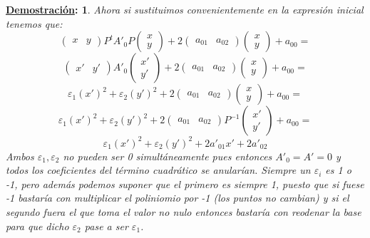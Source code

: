 \documentclass[10pt,a4paper,openright]{book}
\theoremstyle{break}
\newtheorem*{demo}{\underline{Demostración}:}
\begin{document}
\begin{demo}
Ahora si sustituimos convenientemente en la expresión inicial tenemos que:
$$\begin{pmatrix}
x & y
\end{pmatrix}P^t  A'_0 P \begin{pmatrix}
x \\ y
\end{pmatrix} + 2 \begin{pmatrix}
a_{01} & a_{02} \end{pmatrix} \begin{pmatrix}
x \\ y
\end{pmatrix} + a_{00} = $$
$$\begin{pmatrix}
x' & y'
\end{pmatrix} A'_0 \begin{pmatrix}
x' \\ y'
\end{pmatrix} + 2 \begin{pmatrix}
a_{01} & a_{02} \end{pmatrix} \begin{pmatrix}
x \\ y
\end{pmatrix} + a_{00} =$$
$$\varepsilon_1 (x')^2 + \varepsilon_2 (y')^2 + 2 \begin{pmatrix}
a_{01} & a_{02} \end{pmatrix} \begin{pmatrix}
x \\ y
\end{pmatrix} + a_{00} =$$
$$ \varepsilon_1 (x')^2 + \varepsilon_2 (y')^2 + 2 \begin{pmatrix}
a_{01} & a_{02} \end{pmatrix} P^{-1} \begin{pmatrix}
x' \\ y'
\end{pmatrix} + a_{00} = $$
$$\varepsilon_1 (x')^2 + \varepsilon_2 (y')^2 + 2 a'_{01} x' + 2  a'_{02}$$
Ambos $\varepsilon_1 , \varepsilon_2$ no pueden ser 0 simultáneamente pues entonces $A'_0 = A'= 0$ y todos los coeficientes del término cuadrático se anularían. Siempre un $\varepsilon_i$ es 1 o -1, pero además podemos suponer que el primero es siempre 1, puesto que si fuese -1 bastaría con multiplicar el poliniomio por -1 (los puntos no cambian) y si el segundo fuera el que toma el valor no nulo entonces bastaría con reodenar la base para que dicho $\varepsilon_2$ pase a ser $\varepsilon_1$.


\end{demo}
\end{document}
